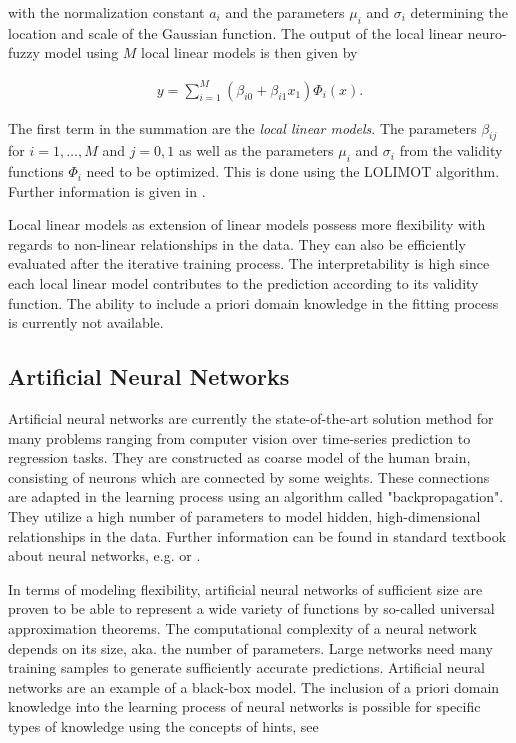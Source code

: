 \documentclass[10pt,a4paper]{article}
\begin{document}
with the normalization constant $a_i$ and the parameters $\mu_i$ and $\sigma_i$ determining the location and scale of the Gaussian function. The output of the local linear neuro-fuzzy model using $M$ local linear models is then given by

\begin{align} \label{eq:LOLIMOT}
	y = \sum_{i=1}^M (\beta_{i0} + \beta_{i1} x_1) \Phi_i(x).
\end{align}

The first term in the summation are the \emph{local linear models}. The parameters $\beta_{ij}$ for $i=1, \dots, M$ and $j=0, 1$ as well as the parameters $\mu_i$ and $\sigma_i$ from the validity functions $\Phi_i$ need to be optimized. This is done using the LOLIMOT algorithm. Further information is given in \cite{nelles2013nonlinear}. 

Local linear models as extension of linear models possess more flexibility with regards to non-linear relationships in the data. They can also be efficiently evaluated after the iterative training process. The interpretability is high since each local linear model contributes to the prediction according to its validity function. The ability to include a priori domain knowledge in the fitting process is currently not available.   

\subsection{Artificial Neural Networks}

Artificial neural networks are currently the state-of-the-art solution method for many problems ranging from computer vision over time-series prediction to regression tasks. They are constructed as coarse model of the human brain, consisting of neurons which are connected by some weights. These connections are adapted in the learning process using an algorithm called "backpropagation". They utilize a high number of parameters to model hidden, high-dimensional relationships in the data. Further information can be found in standard textbook about neural networks, e.g. \cite{bishop2006patternRecognition} or \cite{goodfellow2016deep}. 

In terms of modeling flexibility, artificial neural networks of sufficient size are proven to be able to represent a wide variety of functions by so-called universal approximation theorems.\cite{cybenko1989approximation} \cite{hornik1991approximation} The computational complexity of a neural network depends on its size, aka. the number of parameters. Large networks need many training samples to generate sufficiently accurate predictions. Artificial neural networks are an example of a black-box model. The inclusion of a priori domain knowledge into the learning process of neural networks is possible for specific types of knowledge using the concepts of hints, see \cite{abu1990learning} \cite{sill1997monotonicity}
\end{document}
